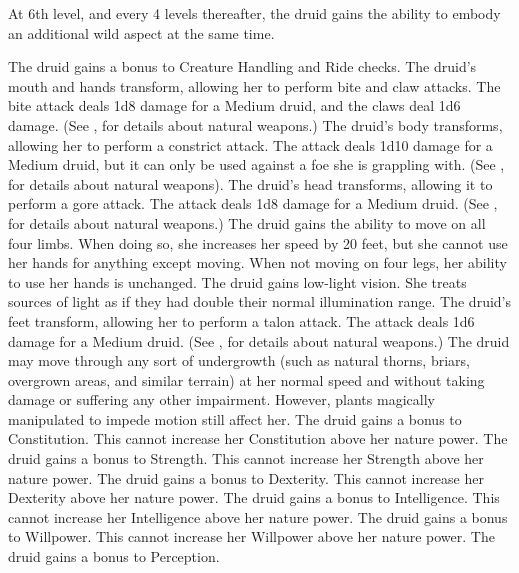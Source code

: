 At 6th level, and every 4 levels thereafter, the druid gains the ability to embody an additional wild aspect at the same time.

The druid gains a  bonus to Creature Handling and Ride checks.
The druid's mouth and hands transform, allowing her to perform bite and claw attacks.
The bite attack deals 1d8 damage for a Medium druid, and the claws deal 1d6 damage.
(See , for details about natural weapons.)
The druid's body transforms, allowing her to perform a constrict attack.
The attack deals 1d10 damage for a Medium druid, but it can only be used against a foe she is grappling with.
(See , for details about natural weapons).
The druid's head transforms, allowing it to perform a gore attack.
The attack deals 1d8 damage for a Medium druid.
(See , for details about natural weapons.)
The druid gains the ability to move on all four limbs.
When doing so, she increases her speed by 20 feet, but she cannot use her hands for anything except moving.
When not moving on four legs, her ability to use her hands is unchanged.
The druid gains low-light vision.
She treats sources of light as if they had double their normal illumination range.
The druid's feet transform, allowing her to perform a talon attack.
The attack deals 1d6 damage for a Medium druid.
(See , for details about natural weapons.)
The druid may move through any sort of undergrowth (such as natural thorns, briars, overgrown areas, and similar terrain) at her normal speed and without taking damage or suffering any other impairment.
However, plants magically manipulated to impede motion still affect her.
The druid gains a  bonus to Constitution.
This cannot increase her Constitution above her nature power.
The druid gains a  bonus to Strength.
This cannot increase her Strength above her nature power.
The druid gains a  bonus to Dexterity.
This cannot increase her Dexterity above her nature power.
The druid gains a  bonus to Intelligence.
This cannot increase her Intelligence above her nature power.
The druid gains a  bonus to Willpower.
This cannot increase her Willpower above her nature power.
The druid gains a  bonus to Perception.
